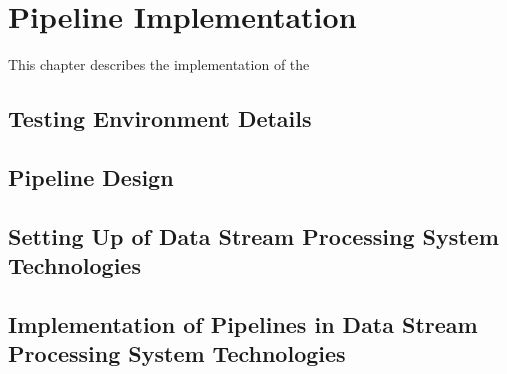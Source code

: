 \section{Pipeline Implementation}
\label{sec:implementation}

This chapter describes the implementation of the

\subsection{Testing Environment Details} %
\label{sub:testing_environment_details}



\subsection{Pipeline Design} %
\label{sub:pipeline_design}



\subsection{Setting Up of Data Stream Processing System Technologies} %
\label{sub:setting_up_of_dsps_technologies}



\subsection{Implementation of Pipelines in Data Stream Processing System Technologies} %
\label{sub:implementation_of_pipelines_in_dsps_technol}

